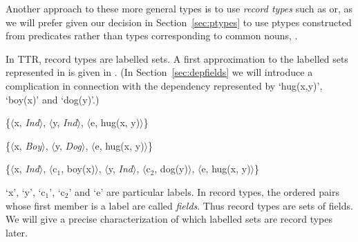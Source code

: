 Another approach to these more general types is to use \textit{record
  types} such as  or, as we will prefer given our decision
in Section~\ref{sec:ptypes}
to use ptypes constructed from predicates rather than types
corresponding to common nouns, .
\begin{ex}
\begin{subex} 
 
\item {}
 
\item {} 

\item {}
 
\end{subex} 
\label{ex:rectype} 
\end{ex} 
  In TTR, record types are labelled
sets.  A first approximation to the labelled sets represented in
\preveg{} is given in \nexteg{}.  (In Section~\ref{sec:depfields} we will introduce
a complication in connection with the dependency represented by
`hug(x,y)', `boy(x)' and `dog(y)'.)
\begin{ex} 
\begin{subex} 
 
\item \{$\langle$x, \textit{Ind}$\rangle$, $\langle$y,
  \textit{Ind}$\rangle$, $\langle$e, hug(x, y)$\rangle$\} 
 
\item \{$\langle$x, \textit{Boy}$\rangle$, $\langle$y,
  \textit{Dog}$\rangle$, $\langle$e, hug(x, y)$\rangle$\} 

\item \{$\langle$x, \textit{Ind}$\rangle$, $\langle$c$_1$,
  boy(x)$\rangle$, $\langle$y,
  \textit{Ind}$\rangle$, $\langle$c$_2$, dog(y)$\rangle$, $\langle$e, hug(x, y)$\rangle$\} 
 
\end{subex} 
   
\end{ex} 
`x', `y', `c$_1$', `c$_2$' and `e' are particular labels.  In record types, the ordered
pairs whose first member is a label are called \textit{fields}.  Thus
record types are sets of fields.  We will give a precise
characterization of which labelled sets are record types later. 

